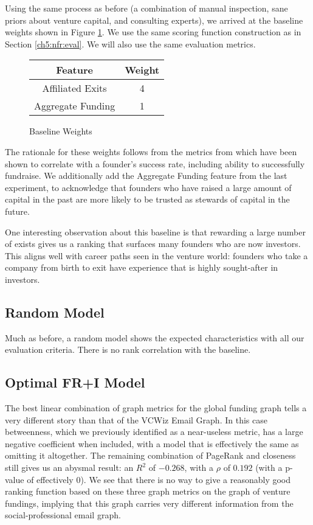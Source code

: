 Using the same process as before (a combination of manual inspection, sane priors about venture capital, and consulting experts), we arrived at the baseline weights shown in Figure \ref{fig:fri:baseline:weights}. We use the same scoring function construction as in Section \ref{ch5:nfr:eval}. We will also use the same evaluation metrics.

\begin{figure}[ht]
\begin{tabular}{c | c}
\textbf{Feature}   & \textbf{Weight} \\\hline
Affiliated Exits   & 4 \\\hline
Aggregate Funding  & 1
\end{tabular}
\centering
\caption{Baseline Weights}
\label{fig:fri:baseline:weights}
\end{figure}

The rationale for these weights follows from the metrics from \cite{2017arXiv170604229H} which have been shown to correlate with a founder's success rate, including ability to successfully fundraise. We additionally add the Aggregate Funding feature from the last experiment, to acknowledge that founders who have raised a large amount of capital in the past are more likely to be trusted as stewards of capital in the future.

One interesting observation about this baseline is that rewarding a large number of exists gives us a ranking that surfaces many founders who are now investors. This aligns well with career paths seen in the venture world: founders who take a company from birth to exit have experience that is highly sought-after in investors.

\subsection{Random Model}

Much as before, a random model shows the expected characteristics with all our evaluation criteria. There is no rank correlation with the baseline.

\subsection{Optimal FR+I Model}

The best linear combination of graph metrics for the global funding graph tells a very different story than that of the VCWiz Email Graph. In this case betweenness, which we previously identified as a near-useless metric, has a large negative coefficient when included, with a model that is effectively the same as omitting it altogether. The remaining combination of PageRank and closeness still gives us an abysmal result: an $R^2$ of $-0.268$, with a $\rho$ of $0.192$ (with a p-value of effectively $0$). We see that there is no way to give a reasonably good ranking function based on these three graph metrics on the graph of venture fundings, implying that this graph carries very different information from the social-professional email graph.

